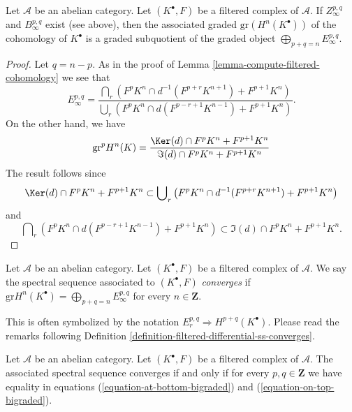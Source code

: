\begin{lemma}
\label{lemma-compute-cohomology-filtered-complex}
Let $\mathcal{A}$ be an abelian category.
Let $(K^\bullet, F)$ be a filtered complex of $\mathcal{A}$.
If $Z_\infty^{p, q}$ and $B_\infty^{p, q}$ exist (see above), then
the associated graded $\text{gr}(H^n(K^\bullet))$ of the cohomology of
$K^\bullet$ is a graded subquotient of the graded object
$\bigoplus_{p + q = n} E_\infty^{p, q}$.
\end{lemma}

\begin{proof}
Let $q = n - p$. As in the proof of
Lemma \ref{lemma-compute-filtered-cohomology} we see that
$$
E_\infty^{p, q} =
\frac{\bigcap_r (F^pK^{n} \cap d^{-1}(F^{p + r}K^{n + 1})
+ F^{p + 1}K^{n})}
{\bigcup_r (F^pK^{n} \cap d(F^{p - r + 1}K^{n - 1})
+ F^{p + 1}K^{n})}.
$$
On the other hand, we have
\begin{equation}
\label{equation-filtration-cohomology}
\text{gr}^p H^{n}(K) =
\frac{\Ker(d) \cap F^pK^{n} + F^{p + 1}K^{n}}
{\Im(d) \cap F^pK^{n} + F^{p + 1}K^{n}}
\end{equation}
The result follows since
\begin{equation}
\label{equation-on-top-bigraded}
\Ker(d) \cap F^pK^{n} + F^{p + 1}K^{n}
\subset
\bigcup\nolimits_r
\left(
F^pK^{n} \cap d^{-1}(F^{p + r}K^{n + 1}) + F^{p + 1}K^{n}
\right)
\end{equation}
and
\begin{equation}
\label{equation-at-bottom-bigraded}
\bigcap\nolimits_r
\left(
F^pK^{n} \cap d(F^{p - r + 1}K^{n - 1}) + F^{p + 1}K^{n}
\right)
\subset
\Im(d) \cap F^pK^{n} + F^{p + 1}K^{n}.
\end{equation}
\end{proof}

\begin{definition}
\label{definition-filtered-complex-ss-converges}
Let $\mathcal{A}$ be an abelian category.
Let $(K^\bullet, F)$ be a filtered complex of $\mathcal{A}$.
We say the spectral sequence associated to $(K^\bullet, F)$
{\it converges} if
$\text{gr} H^n(K^\bullet) = \bigoplus_{p + q = n} E_{\infty}^{p, q}$
for every $n \in \mathbf{Z}$.
\end{definition}

\noindent
This is often symbolized by the notation
$E_r^{p, q} \Rightarrow H^{p + q}(K^\bullet)$.
Please read the remarks following
Definition \ref{definition-filtered-differential-ss-converges}.

\begin{lemma}
\label{lemma-filtered-complex-ss-converges}
Let $\mathcal{A}$ be an abelian category.
Let $(K^\bullet, F)$ be a filtered complex of $\mathcal{A}$.
The associated spectral sequence converges if and only if for every
$p, q \in \mathbf{Z}$ we have equality in equations
(\ref{equation-at-bottom-bigraded}) and (\ref{equation-on-top-bigraded}).
\end{lemma}

